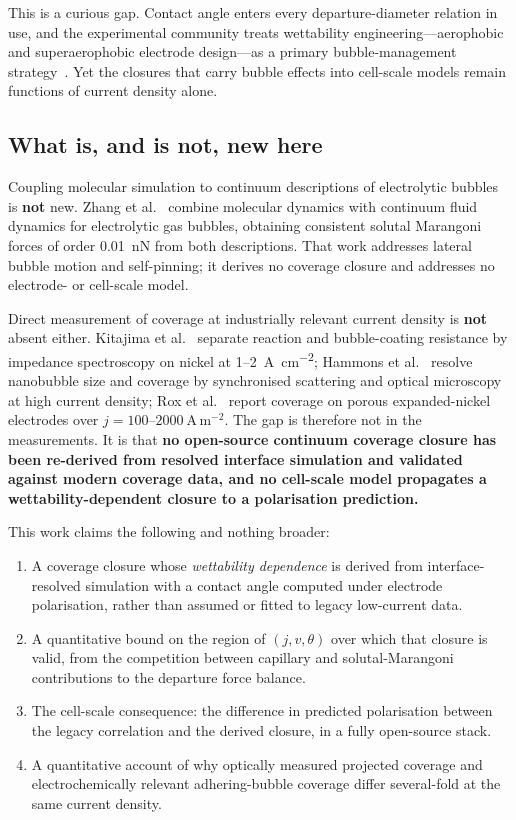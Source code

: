 \documentclass[11pt,a4paper]{article}
\begin{document}
This is a curious gap. Contact angle enters every departure-diameter relation in use, and the
experimental community treats wettability engineering---aerophobic and superaerophobic electrode
design---as a primary bubble-management strategy~\cite{moyo2026}. Yet the closures that carry bubble
effects into cell-scale models remain functions of current density alone.

\subsection{What is, and is not, new here}

Coupling molecular simulation to continuum descriptions of electrolytic bubbles is \textbf{not} new.
Zhang et al.~\cite{zhang2024sm} combine molecular dynamics with continuum fluid dynamics for
electrolytic gas bubbles, obtaining consistent solutal Marangoni forces of order \SI{0.01}{\nano\newton}
from both descriptions. That work addresses lateral bubble motion and self-pinning; it derives no
coverage closure and addresses no electrode- or cell-scale model.

Direct measurement of coverage at industrially relevant current density is \textbf{not} absent
either. Kitajima et al.~\cite{kitajima2024} separate reaction and bubble-coating resistance by
impedance spectroscopy on nickel at 1--\SI{2}{\ampere\per\square\centi\metre};
Hammons et al.~\cite{hammons2024} resolve nanobubble size and coverage by synchronised scattering
and optical microscopy at high current density; Rox et al.~\cite{rox2022} report coverage on porous
expanded-nickel electrodes over $j = 100$--$2000\ \mathrm{A\,m^{-2}}$. The gap is therefore not in
the measurements. It is that \textbf{no open-source continuum coverage closure has been re-derived
from resolved interface simulation and validated against modern coverage data, and no cell-scale
model propagates a wettability-dependent closure to a polarisation prediction.}

This work claims the following and nothing broader:
\begin{enumerate}[leftmargin=*,itemsep=1pt]
\item A coverage closure whose \emph{wettability dependence} is derived from interface-resolved
simulation with a contact angle computed under electrode polarisation, rather than assumed or fitted
to legacy low-current data.
\item A quantitative bound on the region of $(j,v,\theta)$ over which that closure is valid, from the
competition between capillary and solutal-Marangoni contributions to the departure force balance.
\item The cell-scale consequence: the difference in predicted polarisation between the legacy
correlation and the derived closure, in a fully open-source stack.
\item A quantitative account of why optically measured projected coverage and electrochemically
relevant adhering-bubble coverage differ several-fold at the same current density.
\end{enumerate}
\end{document}
